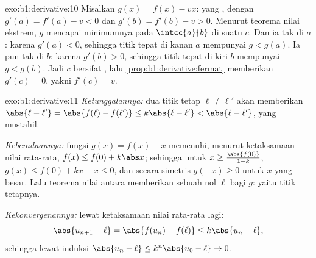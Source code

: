 \begin{solution}{exo:b1:derivative:10}
Misalkan $g(x) = f(x) - vx$: yang , dengan $g'(a) = f'(a) - v < 0$
dan $g'(b) = f'(b) - v > 0$. Menurut teorema nilai ekstrem, $g$
mencapai minimumnya pada $\intcc{a}{b}$ di suatu $c$. Dan ia tak di $a$:
karena $g'(a) < 0$, sehingga titik tepat di kanan $a$ mempunyai $g < g(a)$. Ia pun
tak di $b$: karena $g'(b) > 0$, sehingga titik tepat di kiri $b$ mempunyai $g <
g(b)$. Jadi $c$ bersifat , lalu \cref{prop:b1:derivative:fermat}
memberikan $g'(c) = 0$, yakni $f'(c) = v$.
\end{solution}

\begin{solution}{exo:b1:derivative:11}
\emph{Ketunggalannya:} dua titik tetap $\ell \neq \ell'$ akan memberikan
$\abs{\ell - \ell'} = \abs{f(\ell) - f(\ell')} \leq k\abs{\ell -
\ell'} < \abs{\ell - \ell'}$, yang mustahil.

\emph{Keberadaannya:} fungsi $g(x) = f(x) - x$ memenuhi, menurut ketaksamaan
nilai rata-rata, $f(x) \leq f(0) + k\abs x$; sehingga untuk $x \geq
\frac{\abs{f(0)}}{1 - k}$, $g(x) \leq f(0) + kx - x \leq 0$, dan
secara simetris $g(-x) \geq 0$ untuk $x$ yang besar. Lalu teorema nilai
antara memberikan sebuah nol $\ell$ bagi $g$: yaitu titik tetapnya.

\emph{Kekonvergenannya:} lewat ketaksamaan nilai rata-rata lagi:
\[
\abs{u_{n+1} - \ell} = \abs{f(u_n) - f(\ell)} \leq k\abs{u_n - \ell},
\]
sehingga lewat induksi $\abs{u_n - \ell} \leq k^n \abs{u_0 - \ell} \to 0$.
\end{solution}


